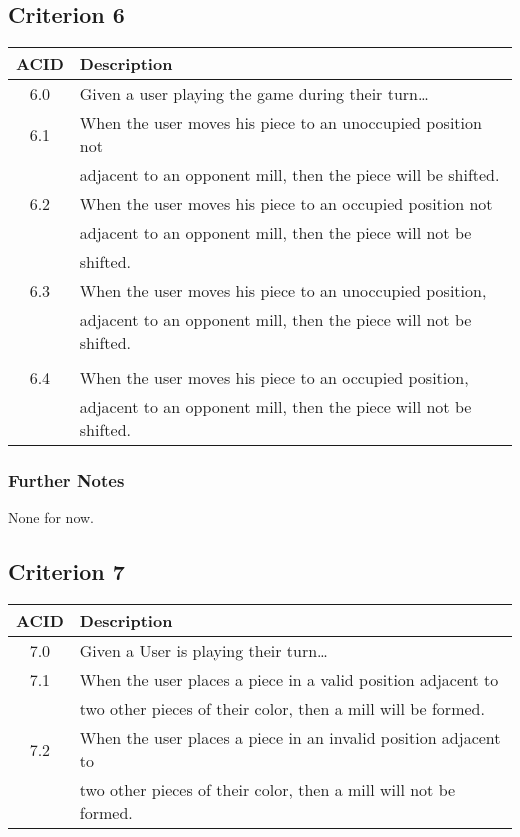 \documentclass[11pt]{article}
\begin{document}
\subsection{Criterion 6}
\label{sec:org7d9fafd}
\begin{center}
\begin{tabular}{|c|l|}
ACID & Description\\
\hline
6.0 & Given a user playing the game during their turn\ldots{}\\
\hline
6.1 & When the user moves his piece to an unoccupied position not\\
 & adjacent to an opponent mill, then the piece will be shifted.\\
6.2 & When the user moves his piece to an occupied position not\\
 & adjacent to an opponent mill, then the piece will not be\\
 & shifted.\\
6.3 & When the user moves his piece to an unoccupied position,\\
 & adjacent to an opponent mill, then the  piece will not be shifted.\\
 & \\
6.4 & When the user moves his piece to an occupied position,\\
 & adjacent to an opponent mill, then the  piece will not be shifted.\\
\end{tabular}
\end{center}

\subsubsection*{Further Notes}
\label{sec:orgb61eda0}
None for now.

\subsection{Criterion 7}
\label{sec:org2392c9b}
\begin{center}
\begin{tabular}{|c|l|}
ACID & Description\\
\hline
7.0 & Given a User is playing their turn\ldots{}\\
\hline
7.1 & When the user places a piece in a valid position adjacent to\\
 & two other pieces of their color, then a mill will be formed.\\
7.2 & When the user places a piece in an invalid position adjacent to\\
 & two other pieces of their color, then a mill will not be formed.\\
\end{tabular}
\end{center}
\end{document}
